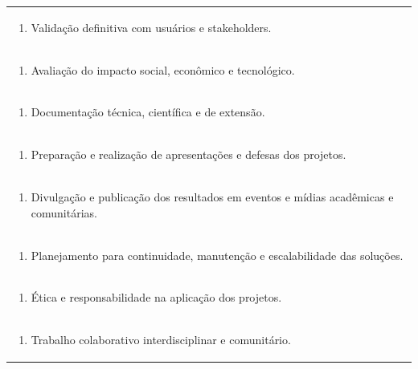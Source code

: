 \documentclass[11pt]{article}
\begin{document}
\begin{center}
\begin{longtable}{|p{4cm}|p{4cm}|p{4cm}|p{4cm}|}
\multicolumn{4}{|p{\dimexpr 16cm + 6\tabcolsep\relax}|}{\begin{enumerate}[start=2]\item Validação definitiva com usuários e stakeholders.\end{enumerate}}\\
\multicolumn{4}{|p{\dimexpr 16cm + 6\tabcolsep\relax}|}{\begin{enumerate}[start=3]\item Avaliação do impacto social, econômico e tecnológico.\end{enumerate}}\\
\multicolumn{4}{|p{\dimexpr 16cm + 6\tabcolsep\relax}|}{\begin{enumerate}[start=4]\item Documentação técnica, científica e de extensão.\end{enumerate}}\\
\multicolumn{4}{|p{\dimexpr 16cm + 6\tabcolsep\relax}|}{\begin{enumerate}[start=5]\item Preparação e realização de apresentações e defesas dos projetos.\end{enumerate}}\\
\multicolumn{4}{|p{\dimexpr 16cm + 6\tabcolsep\relax}|}{\begin{enumerate}[start=6]\item Divulgação e publicação dos resultados em eventos e mídias acadêmicas e comunitárias.\end{enumerate}}\\
\multicolumn{4}{|p{\dimexpr 16cm + 6\tabcolsep\relax}|}{\begin{enumerate}[start=7]\item Planejamento para continuidade, manutenção e escalabilidade das soluções.\end{enumerate}}\\
\multicolumn{4}{|p{\dimexpr 16cm + 6\tabcolsep\relax}|}{\begin{enumerate}[start=8]\item Ética e responsabilidade na aplicação dos projetos.\end{enumerate}}\\
\multicolumn{4}{|p{\dimexpr 16cm + 6\tabcolsep\relax}|}{\begin{enumerate}[start=9]\item Trabalho colaborativo interdisciplinar e comunitário.\end{enumerate}}\\

\end{longtable}
\end{center}
\end{document}
